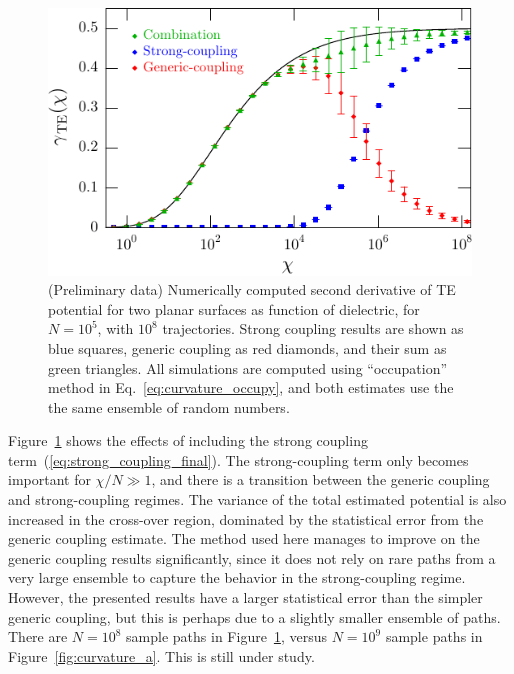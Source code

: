 \begin{figure}
  \centering
  \includegraphics[width=0.8\columnwidth]{fig/numerics/curvature_c}
  \caption[(Preliminary data) Numerical TE Potential Curvature for two planar surfaces, evaluated with strong-coupling methods]{
(Preliminary data) Numerically computed second derivative of TE potential for two planar surfaces as function 
    of dielectric, for $N=10^5$, with $10^8$ trajectories.
    Strong coupling results are shown as blue squares, generic coupling as red diamonds, 
    and their sum as green triangles.  
    All simulations are computed using
  ``occupation'' method in Eq.~\ref{eq:curvature_occupy}, and both estimates use the the same ensemble of random numbers.}
\label{fig:curvature_c}
\end{figure}

Figure~\ref{fig:curvature_c} shows the effects of including the strong coupling term~(\ref{eq:strong_coupling_final}).  
The strong-coupling term only becomes important for $\chi/N\gg 1$,
and there is a transition between the generic coupling and strong-coupling regimes. 
The variance of the total estimated potential is also increased in the cross-over region, 
dominated by the statistical error from the generic coupling estimate.  
The method used here manages to improve on the generic coupling results significantly, since 
it does not rely on rare paths from a very large ensemble to capture the behavior in the strong-coupling regime.
However, the presented results have a larger statistical error than the simpler generic coupling, but this is 
perhaps due to a slightly smaller ensemble of paths.  There are $N=10^8$ sample paths in Figure~\ref{fig:curvature_c}, versus $N=10^9$ 
sample paths in Figure~\ref{fig:curvature_a}.  This is
still under study.   

